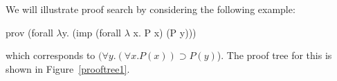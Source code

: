 \documentclass{acmconf}
\newcommand{\impl}{\supset}
\newcommand{\impI}{\textsf{impI}}
\newcommand{\allI}{\textsf{allI}}
\newcommand{\allE}{\textsf{allE}}
\newcommand{\impE}{\textsf{impE}}
\newcommand{\vd}{\vdash}
\begin{document}
We will illustrate proof search by considering the following example: 

\begin{code}
 prov (forall $\lambda$y. (imp (forall $\lambda$ x. P x) (P y)))  
\end{code}

which corresponds to $(\forall y. (\forall x.P(x)) \impl P(y)$).  The
proof tree for this is shown in Figure~\ref{prooftree1}.


\end{document}
